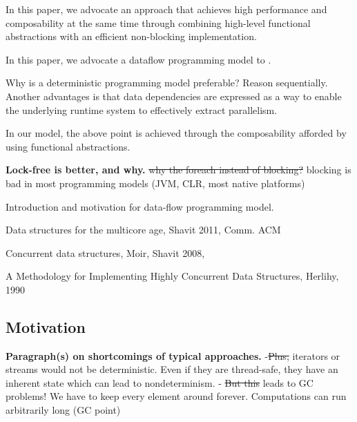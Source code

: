 \documentclass[runningheads,a4paper]{llncs}
\begin{document}
In this paper, we advocate an approach that achieves high performance and composability at the same time through combining high-level functional abstractions with an efficient non-blocking implementation.

In this paper, we advocate a dataflow programming model to .


Why is a deterministic programming model preferable? Reason sequentially.
Another advantages is that data dependencies are expressed as a way to enable
the underlying runtime system to effectively extract parallelism.

In our model, the above point is achieved through the composability afforded
by using functional abstractions.




\textbf{Lock-free is better, and why.} 
\sout{why the foreach instead of blocking?} blocking is bad in most
   programming models (JVM, CLR, most native platforms) \cite{Herlihy90}

Introduction and motivation for data-flow programming model.


Data structures for the multicore age, Shavit 2011, Comm. ACM \cite{Shavit11}

Concurrent data structures, Moir, Shavit 2008, \cite{Moir05}

A Methodology for Implementing Highly Concurrent Data Structures, Herlihy, 1990 \cite{Herlihy90}

\subsection{Motivation}

\textbf{Paragraph(s) on shortcomings of typical approaches.} 
-\sout{Plus,} iterators or streams would not be deterministic. Even if they
are thread-safe, they have an inherent state which can lead to nondeterminism.
- \sout{But this} leads to GC problems! We have to keep every element around
forever. Computations can run arbitrarily long (GC point)
\end{document}
